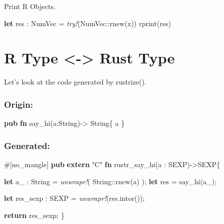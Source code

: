 \documentclass[]{book}
\newenvironment{Shaded}{\begin{snugshade}}{\end{snugshade}}
\newcommand{\KeywordTok}[1]{\textcolor[rgb]{0.13,0.29,0.53}{\textbf{{#1}}}}
\newcommand{\DataTypeTok}[1]{\textcolor[rgb]{0.13,0.29,0.53}{{#1}}}
\newcommand{\StringTok}[1]{\textcolor[rgb]{0.31,0.60,0.02}{{#1}}}
\newcommand{\PreprocessorTok}[1]{\textcolor[rgb]{0.56,0.35,0.01}{\textit{{#1}}}}
\newcommand{\AttributeTok}[1]{\textcolor[rgb]{0.77,0.63,0.00}{{#1}}}
\newcommand{\NormalTok}[1]{{#1}}
\begin{document}
Print R Objects.

\begin{Shaded}
\begin{Highlighting}[]
\KeywordTok{let} \NormalTok{res : NumVec = }\PreprocessorTok{try!}\NormalTok{(NumVec::rnew(x))}
\NormalTok{rprint(res)}
\end{Highlighting}
\end{Shaded}

\chapter{R Type \textless{}-\textgreater{} Rust
Type}\label{r-type---rust-type}

Let's look at the code generated by rustrize().

\subsection{Origin:}\label{origin}

\begin{Shaded}
\begin{Highlighting}[]
\KeywordTok{pub} \KeywordTok{fn} \NormalTok{say_hi(a:}\DataTypeTok{String}\NormalTok{)-> }\DataTypeTok{String}\NormalTok{\{}
    \NormalTok{a}
\NormalTok{\}}
\end{Highlighting}
\end{Shaded}

\subsection{Generated:}\label{generated}

\begin{Shaded}
\begin{Highlighting}[]
\AttributeTok{#[}\NormalTok{no_mangle}\AttributeTok{]}
\KeywordTok{pub} \KeywordTok{extern} \StringTok{"C"} \KeywordTok{fn} \NormalTok{rustr_say_hi(a : SEXP)->SEXP\{}

 \KeywordTok{let} \NormalTok{a_ : }\DataTypeTok{String} \NormalTok{= }\PreprocessorTok{unwrapr!}\NormalTok{( }\DataTypeTok{String}\NormalTok{::rnew(a) );}
 \KeywordTok{let} \NormalTok{res  = say_hi(a_);}

 \KeywordTok{let} \NormalTok{res_sexp : SEXP = }\PreprocessorTok{unwrapr!}\NormalTok{(res.intor());}

 \KeywordTok{return} \NormalTok{res_sexp;}
\NormalTok{\}}
\end{Highlighting}
\end{Shaded}
\end{document}

